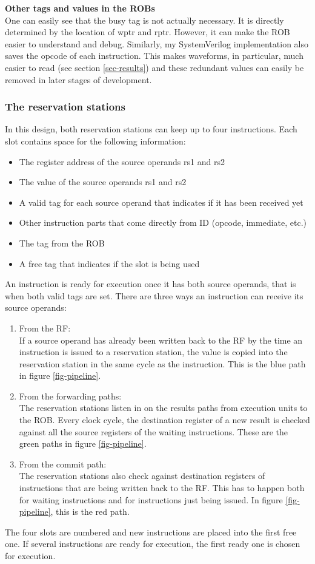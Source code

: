 \documentclass[12pt,a4paper]{article} %
\begin{document}
\textbf{Other tags and values in the ROBs}\\
One can easily see that the busy tag is not actually necessary. It is directly determined by the location of wptr and rptr. However, it can make the ROB easier to understand and debug. Similarly, my SystemVerilog implementation also saves the opcode of each instruction. This makes waveforms, in particular, much easier to read (see section \ref{sec-results}) and these redundant values can easily be removed in later stages of development.\\ 

\subsubsection{The reservation stations} \label{sec-RS}
In this design, both reservation stations can keep up to four instructions. Each slot contains space for the following information:
\begin{itemize}
	\item The register address of the source operands rs1 and rs2 
	\item The value of the source operands rs1 and rs2
	\item A valid tag for each source operand that indicates if it has been received yet
	\item Other instruction parts that come directly from ID (opcode, immediate, etc.)
	\item The tag from the ROB
	\item A free tag that indicates if the slot is being used
\end{itemize}
An instruction is ready for execution once it has both source operands, that is when both valid tags are set. There are three ways an instruction can receive its source operands:
\begin{enumerate}
	\item From the RF:\\
	If a source operand has already been written back to the RF by the time an instruction is issued to a reservation station, the value is copied into the reservation station in the same cycle as the instruction. This is the blue path in figure \ref{fig-pipeline}.
	\item From the forwarding paths:\\
	The reservation stations listen in on the results paths from execution units to the ROB. Every clock cycle, the destination register of a new result is checked against all the source registers of the waiting instructions. These are the green paths in figure \ref{fig-pipeline}.
	\item From the commit path:\\
	The reservation stations also check against destination registers of instructions that are being written back to the RF. This has to happen both for waiting instructions and for instructions just being issued. In figure \ref{fig-pipeline}, this is the red path. 
\end{enumerate}
The four slots are numbered and new instructions are placed into the first free one. If several instructions are ready for execution, the first ready one is chosen for execution. 
\end{document}
